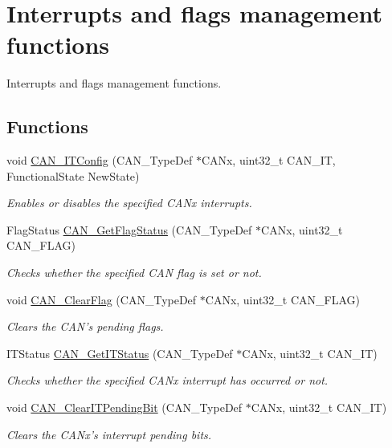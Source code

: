 \hypertarget{group___c_a_n___group6}{\section{Interrupts and flags management functions}
\label{group___c_a_n___group6}
}


Interrupts and flags management functions.  


\subsection*{Functions}
\begin{DoxyCompactItemize}
\item 
void \hyperlink{group___c_a_n___group6_gad1a8b2499a780b5bfa4accb3597b02f4}{C\-A\-N\-\_\-\-I\-T\-Config} (C\-A\-N\-\_\-\-Type\-Def $\ast$C\-A\-Nx, uint32\-\_\-t C\-A\-N\-\_\-\-I\-T, Functional\-State New\-State)
\begin{DoxyCompactList}\small\item\em Enables or disables the specified C\-A\-Nx interrupts. \end{DoxyCompactList}\item 
Flag\-Status \hyperlink{group___c_a_n___group6_ga2faad96caf823ef463cc5b5b25c480bb}{C\-A\-N\-\_\-\-Get\-Flag\-Status} (C\-A\-N\-\_\-\-Type\-Def $\ast$C\-A\-Nx, uint32\-\_\-t C\-A\-N\-\_\-\-F\-L\-A\-G)
\begin{DoxyCompactList}\small\item\em Checks whether the specified C\-A\-N flag is set or not. \end{DoxyCompactList}\item 
void \hyperlink{group___c_a_n___group6_ga2c01646d5d3a2d7045e8dd71f58f8742}{C\-A\-N\-\_\-\-Clear\-Flag} (C\-A\-N\-\_\-\-Type\-Def $\ast$C\-A\-Nx, uint32\-\_\-t C\-A\-N\-\_\-\-F\-L\-A\-G)
\begin{DoxyCompactList}\small\item\em Clears the C\-A\-N's pending flags. \end{DoxyCompactList}\item 
I\-T\-Status \hyperlink{group___c_a_n___group6_ga9aca05b3013e1b3438f3559f80b33c82}{C\-A\-N\-\_\-\-Get\-I\-T\-Status} (C\-A\-N\-\_\-\-Type\-Def $\ast$C\-A\-Nx, uint32\-\_\-t C\-A\-N\-\_\-\-I\-T)
\begin{DoxyCompactList}\small\item\em Checks whether the specified C\-A\-Nx interrupt has occurred or not. \end{DoxyCompactList}\item 
void \hyperlink{group___c_a_n___group6_ga30bf7ac0c1793f6622a4a1adbb7dbc8a}{C\-A\-N\-\_\-\-Clear\-I\-T\-Pending\-Bit} (C\-A\-N\-\_\-\-Type\-Def $\ast$C\-A\-Nx, uint32\-\_\-t C\-A\-N\-\_\-\-I\-T)
\begin{DoxyCompactList}\small\item\em Clears the C\-A\-Nx's interrupt pending bits. \end{DoxyCompactList}\end{DoxyCompactItemize}


